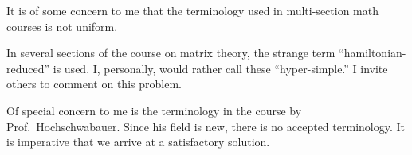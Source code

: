 \documentclass[draft]{article}
\begin{document}
It is of some concern to me   that 
the terminology used in  multi-section
 math courses is not uniform.

In several sections of the course on 
matrix theory, the strange term   
 ``hamiltonian-reduced'' is used. 
  I, personally, would rather call these ``hyper-simple.'' I
invite others to comment on this  problem.

Of special concern to me is the terminology in the course 
by Prof.~Hochschwabauer.
  Since his field is new, there is
 no accepted
terminology.   It is imperative 
that we arrive at a satisfactory solution.
\end{document}
